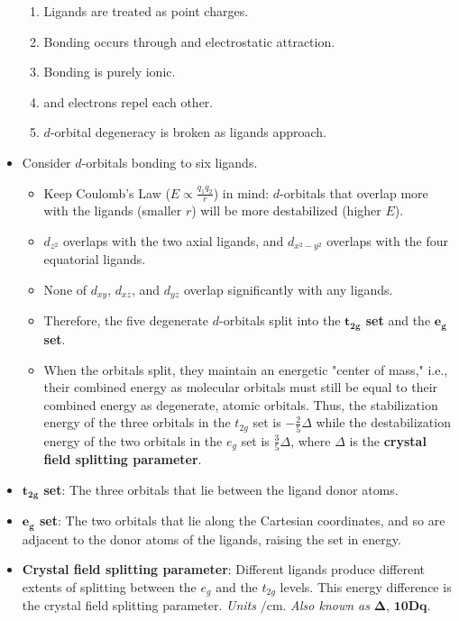 \documentclass[../notes.tex]{subfiles}
\begin{document}
\begin{itemize}
\begin{enumerate}
        \item Ligands are treated as point charges.
        \item Bonding occurs through  and  electrostatic attraction.
        \item Bonding is purely ionic.
        \item {} and  electrons repel each other.
        \item $d$-orbital degeneracy is broken as ligands approach.
    \end{enumerate}
    \item Consider $d$-orbitals bonding to six ligands.
    \begin{itemize}
        \item Keep Coulomb's Law ($E\propto\frac{q_1q_2}{r}$) in mind: $d$-orbitals that overlap more with the ligands (smaller $r$) will be more destabilized (higher $E$).
        \item $d_{z^2}$ overlaps with the two axial ligands, and $d_{x^2-y^2}$ overlaps with the four equatorial ligands.
        \item None of $d_{xy}$, $d_{xz}$, and $d_{yz}$ overlap significantly with any ligands.
        \item Therefore, the five degenerate $d$-orbitals split into the \textbf{$\bm{t_{2g}}$ set} and the \textbf{$\bm{e_g}$ set}.
        \item When the orbitals split, they maintain an energetic "center of mass," i.e., their combined energy as molecular orbitals must still be equal to their combined energy as degenerate, atomic orbitals. Thus, the stabilization energy of the three orbitals in the $t_{2g}$ set is $-\frac{2}{5}\Delta$ while the destabilization energy of the two orbitals in the $e_g$ set is $\frac{3}{5}\Delta$, where $\Delta$ is the \textbf{crystal field splitting parameter}.
    \end{itemize}
    \item \textbf{$\bm{t_{2g}}$ set}: The three orbitals that lie between the ligand donor atoms.
    \item \textbf{$\bm{e_g}$ set}: The two orbitals that lie along the Cartesian coordinates, and so are adjacent to the donor atoms of the ligands, raising the set in energy.
    \item \textbf{Crystal field splitting parameter}: Different ligands produce different extents of splitting between the $e_g$ and the $t_{2g}$ levels. This energy difference is the crystal field splitting parameter. \emph{Units} $\si{\per\centi\meter}$. \emph{Also known as} $\bm{\Delta}$, $\bm{10Dq}$.

\end{itemize}
\end{document}
